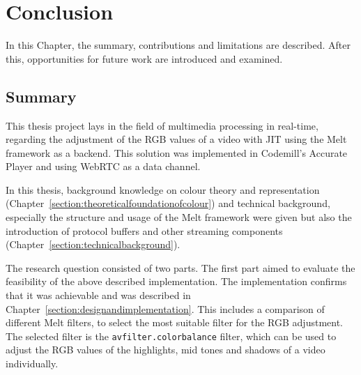 \documentclass[../MasterThesis.tex]{subfiles}
\begin{document}
	
	
%
%
%
%
%
%
%
%
\newpage
\section{Conclusion} \label{section:conclusion}

In this Chapter, the summary, contributions and limitations are described. After this, opportunities for future work are introduced and examined.






\subsection{Summary} \label{subsection:summary}


This thesis project lays in the field of multimedia processing in real-time, regarding the adjustment of the RGB values of a video with JIT using the Melt framework as a backend. This solution was implemented in Codemill's Accurate Player and using WebRTC as a data channel.

In this thesis, background knowledge on colour theory and representation (Chapter~\ref{section:theoreticalfoundationofcolour}) and technical background, especially the structure and usage of the Melt framework were given but also the introduction of protocol buffers and other streaming components (Chapter~\ref{section:technicalbackground}).

The research question consisted of two parts. The first part aimed to evaluate the feasibility of the above described implementation. The implementation confirms that it was achievable and was described in Chapter~\ref{section:designandimplementation}. This includes a comparison of different Melt filters, to select the most suitable filter for the RGB adjustment. The selected filter is the \texttt{avfilter.colorbalance} filter, which can be used to adjust the RGB values of the highlights, mid tones and shadows of a video individually.
\end{document}
